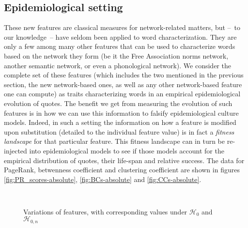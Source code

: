 \subsection{Epidemiological setting}

 


These new features are classical measures for network-related matters, but --~to our knowledge~-- have seldom been applied to word characterization. They are only a few among many other features that can be used to characterize words based on the network they form (be it the Free Association norms network, another semantic network, or even a phonological network). We consider the complete set of these features (which includes the two mentioned in the previous section, the new network-based ones, as well as any other network-based feature one can compute) as traits characterizing words in an empirical epidemiological evolution of quotes. The benefit we get from measuring the evolution of such features is in how we can use this information to falsify epidemiological culture models. Indeed, in such a setting the information on how a feature is modified upon substitution (detailed to the individual feature value) is in fact a \emph{fitness landscape} for that particular feature. This fitness landscape can in turn be re-injected into epidemiological models to see if those models account for the empirical distribution of quotes, their life-span and relative success. The data for PageRank, betwenness coefficient and clustering coefficient are shown in figures \ref{fig:PR_scores-absolute}, \ref{fig:BCs-absolute} and \ref{fig:CCs-absolute}.



\begin{figure*}[!th]
	\centering
	~
	~
	\caption{Variations of features, with corresponding values under $\mathcal{H}_0$ and $\mathcal{H}_{0,n}$}
\end{figure*}


